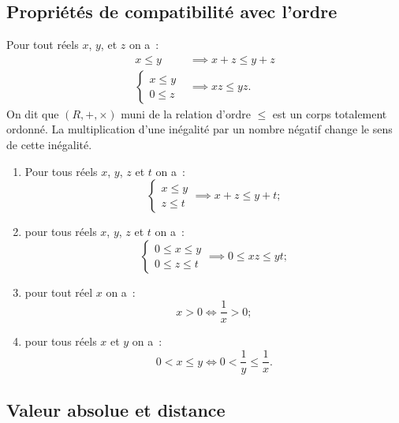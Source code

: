 \subsection{Propriétés de compatibilité avec l'ordre}

\begin{prop}
  Pour tout réels $x$, $y$, et $z$ on a~:
  \begin{align}
    x\leq y &\implies x+z\leq y+z \\
    \begin{cases} x\leq y \\ 0\leq z \end{cases} &\implies xz \leq yz.
  \end{align}
On dit que $(R,+,\times)$ muni de la relation d'ordre $\leq$ est un corps totalement ordonné. La multiplication d'une inégalité par un nombre négatif change le sens de cette inégalité.
\end{prop}
\begin{enumerate}
\item Pour tous réels $x$, $y$, $z$ et $t$ on a~:
  \begin{equation}
    \begin{cases}x\leq y \\ z \leq t \end{cases} \implies x+z\leq y+t;
  \end{equation}
\item pour tous réels $x$, $y$, $z$ et $t$ on a~:
  \begin{equation}
    \begin{cases}0\leq x\leq y \\ 0 \leq z \leq t \end{cases} \implies 0\leq xz \leq yt;
  \end{equation}
\item pour tout réel $x$ on a~:
  \begin{equation}
    x>0 \iff \frac{1}{x}>0;
  \end{equation}
\item pour tous réels $x$ et $y$ on a~:
  \begin{equation}
    0<x\leq y \iff 0<\frac{1}{y}\leq \frac{1}{x}.
  \end{equation}
\end{enumerate}

\subsection{Valeur absolue et distance}

